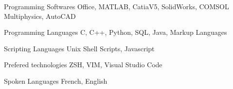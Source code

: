 

\begin{cvskills}

  \cvskill
    {Programming Softwares} %
    {Office, MATLAB, CatiaV5, SolidWorks, COMSOL Multiphysics, AutoCAD} %

  \cvskill
    {Programming Languages} %
    {C, C++, Python, SQL, Java, Markup Languages} %

  \cvskill
    {Scripting Languages} %
    {Unix Shell Scripts, Javascript}

  \cvskill
    {Prefered technologies} %
    {ZSH, VIM, Visual Studio Code} %

  \cvskill
    {Spoken Languages} %
    {French, English} %

\end{cvskills}
